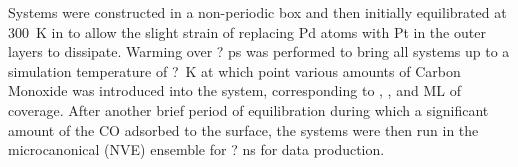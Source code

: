 Systems were constructed in a non-periodic box and then initially equilibrated
at 300~K in to allow the slight strain of replacing Pd atoms with Pt in the
outer layers to dissipate. Warming over ? ps was performed to bring all systems
up to a simulation temperature of ?~K at which point various amounts of Carbon
Monoxide was introduced into the system, corresponding to , , and ML of
coverage. After another brief period of equilibration during which a
significant amount of the CO adsorbed to the surface, the systems were then run
in the microcanonical (NVE) ensemble for ? ns for data production.



